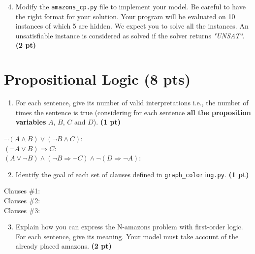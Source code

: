 \documentclass[11pt,a4paper]{report}
\begin{document}
\begin{answers}[10cm]

\end{answers}

\begin{enumerate}
	\setcounter{enumi}{3}
	\item Modify the \texttt{amazons\_cp.py} file to implement your model.
	Be careful to have the right format for your solution. 
	Your program will be evaluated on 10 instances of which 5 are hidden. 
	We expect you to solve all the instances.
	An unsatisfiable instance is considered as solved if the solver returns \textit{"UNSAT"}. \textbf{(2 pt)}
\end{enumerate}

\section{Propositional Logic (8 pts)}

\begin{enumerate}
	\item For each sentence, give its number of valid interpretations i.e., the number of times the sentence is true 
	(considering for each sentence {\bf all the proposition variables} $A$, $B$, $C$ and $D$). \textbf{(1 pt)}
\end{enumerate}

\begin{answers}[4cm]
	$\neg ( A \land B) \lor (\neg B \land C)$: \\
	$(\neg A \lor B) \Rightarrow C $: \\
	$( A \lor \neg B) \land (\neg B \Rightarrow \neg C) \land \neg (D \Rightarrow \neg A)$: 
\end{answers}

\newpage
\begin{enumerate}
	\setcounter{enumi}{1}
	\item Identify the goal of each set of clauses defined in \texttt{graph\_coloring.py}. \textbf{(1 pt)}
\end{enumerate}

\begin{answers}[4cm]
	Clauses \#1: \\
	Clauses \#2: \\
	Clauses \#3: \\
\end{answers}

\begin{enumerate}
	\setcounter{enumi}{2}
	\item Explain how you can express the N-amazons problem with first-order logic. For each sentence, give its meaning.
	Your model must take account of the already placed amazons. \textbf{(2 pt)}
\end{enumerate}
\end{document}
